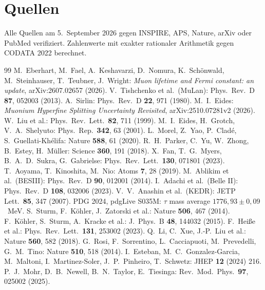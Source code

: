 \section*{Quellen}

Alle Quellen am 5.~September 2026 gegen INSPIRE, APS, Nature, arXiv oder PubMed verifiziert. Zahlenwerte mit exakter rationaler Arithmetik gegen CODATA 2022 berechnet.

\begin{thebibliography}{99}\small
{} M.~Eberhart, M.~Fael, A.~Keshavarzi, D.~Nomura, K.~Schönwald, M.~Steinhauser, T.~Teubner, J.~Wright: \emph{Muon lifetime and Fermi constant: an update}, arXiv:2607.02657 (2026).
 V.~Tishchenko et al.\ (MuLan): Phys.\ Rev.\ D \textbf{87}, 052003 (2013).
 A.~Sirlin: Phys.\ Rev.\ D \textbf{22}, 971 (1980).
 M.~I.~Eides: \emph{Muonium Hyperfine Splitting Uncertainty Revisited}, arXiv:2510.07281v2 (2026).
 W.~Liu et al.: Phys.\ Rev.\ Lett.\ \textbf{82}, 711 (1999).
 M.~I.~Eides, H.~Grotch, V.~A.~Shelyuto: Phys.\ Rep.\ \textbf{342}, 63 (2001).
 L.~Morel, Z.~Yao, P.~Cladé, S.~Guellati-Khélifa: Nature \textbf{588}, 61 (2020).
 R.~H.~Parker, C.~Yu, W.~Zhong, B.~Estey, H.~Müller: Science \textbf{360}, 191 (2018).
 X.~Fan, T.~G.~Myers, B.~A.~D.~Sukra, G.~Gabrielse: Phys.\ Rev.\ Lett.\ \textbf{130}, 071801 (2023).
 T.~Aoyama, T.~Kinoshita, M.~Nio: Atoms \textbf{7}, 28 (2019).
 M.~Ablikim et al.\ (BESIII): Phys.\ Rev.\ D \textbf{90}, 012001 (2014).
 I.~Adachi et al.\ (Belle II): Phys.\ Rev.\ D \textbf{108}, 032006 (2023).
 V.~V.~Anashin et al.\ (KEDR): JETP Lett.\ \textbf{85}, 347 (2007).
 PDG 2024, pdgLive S035M: $\tau$ mass average $1776{,}93\pm0{,}09$~MeV.
 S.~Sturm, F.~Köhler, J.~Zatorski et al.: Nature \textbf{506}, 467 (2014).
 F.~Köhler, S.~Sturm, A.~Kracke et al.: J.\ Phys.\ B \textbf{48}, 144032 (2015).
 F.~Heiße et al.: Phys.\ Rev.\ Lett.\ \textbf{131}, 253002 (2023).
 Q.~Li, C.~Xue, J.-P.~Liu et al.: Nature \textbf{560}, 582 (2018).
 G.~Rosi, F.~Sorrentino, L.~Cacciapuoti, M.~Prevedelli, G.~M.~Tino: Nature \textbf{510}, 518 (2014).
 I.~Esteban, M.~C.~Gonzalez-Garcia, M.~Maltoni, I.~Martinez-Soler, J.~P.~Pinheiro, T.~Schwetz: JHEP \textbf{12} (2024) 216.
 P.~J.~Mohr, D.~B.~Newell, B.~N.~Taylor, E.~Tiesinga: Rev.\ Mod.\ Phys.\ \textbf{97}, 025002 (2025).
\end{thebibliography}

